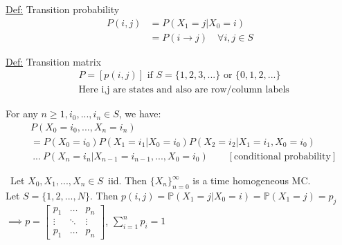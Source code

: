 \documentclass[12pt, letterpaper]{article}
\begin{document}
\noindent \underline{Def:} Transition probability
\begin{align*}
    P(i,j) &= P(X_1 = j | X_0 = i)\\
    &= P(i\rightarrow j ) \quad \forall i,j \in S
\end{align*}

\noindent \underline{Def:} Transition matrix
\begin{align*}
    &P=[p(i,j)] \text{ if } S = \{1,2,3,...\} \text{ or } \{0,1,2,...\} \\
    &\text{Here i,j are states and also are row/column labels}
\end{align*}

\noindent For any $n\ge 1, i_0, ..., i_n \in S$, we have:
\begin{align*}
    &P(X_0 = i_0, ..., X_n = i_n) \\
    &= P(X_0 = i_0) P(X_1 = i_1 | X_0 = i_0) P(X_2 = i_2 | X_1 = i_1, X_0 = i_0) \\
    &\ ...\ P(X_n = i_n | X_{n-1} = i_{n-1},..., X_0 = i_0)\qquad [\text{conditional probability}]
\end{align*}

\noindent {} \ Let $X_0, X_1,...,X_n \in S$\ iid. Then $\{X_n\}^\infty_{n=0}$ 
is a time homogeneous MC. \\
Let $S = \{1,2,...,N\}$. Then $p(i,j)=\mathbb{P}(X_1 = j | X_0 = i) = \mathbb{P}(X_1=j)=p_j$ \\
$\implies p = \begin{bmatrix}
    p_1 & \dots & p_n \\
    \vdots & \ddots & \vdots \\
    p_1 & \dots & p_n
\end{bmatrix}$, $\displaystyle\sum_{i=1}^{n} p_i = 1$
\end{document}
